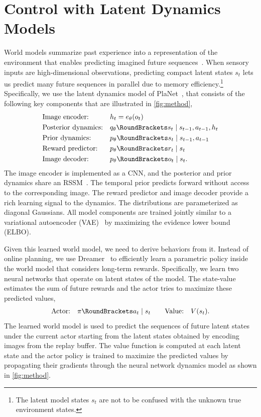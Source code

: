 \documentclass{article}
\begin{document}
\section{Control with Latent Dynamics Models}
\label{sec:background}
World models summarize past experience into a representation of the environment that enables predicting imagined future sequences~\cite{sutton1991dyna,watter2015embed,ha2018world}. When sensory inputs are high-dimensional observations, predicting compact latent states $s_t$ lets us predict many future sequences in parallel due to memory efficiency.\footnote{The latent model states $s_t$ are not to be confused with the unknown true environment states.} Specifically, we use the latent dynamics model of PlaNet~\cite{hafner2018planet}, that consists of the following key components that are illustrated in \cref{fig:method},
\begin{gather}
\begin{aligned}
&\text{Image encoder:} &&h_t=e_\theta(o_t) \\
&\text{Posterior dynamics:} &&\pr[q_\theta](s_t|s_{t-1},a_{t-1},h_t) \\
&\text{Prior dynamics:} &&\pr[p_\theta](s_t|s_{t-1},a_{t-1}) \\
&\text{Reward predictor:} &&\pr[p_\theta](r_t|s_t) \\
&\text{Image decoder:} &&\pr[p_\theta](o_t|s_t).
\label{eq:world_model}
\end{aligned}
\end{gather}%
The image encoder is implemented as a CNN, and the posterior and prior dynamics share an RSSM~\cite{hafner2018planet}. The temporal prior predicts forward without access to the corresponding image. The reward predictor and image decoder provide a rich learning signal to the dynamics. The distributions are parameterized as diagonal Gaussians. All model components are trained jointly similar to a variational autoencoder (VAE)~\cite{kingma2013vae,rezende2014vae} by maximizing the evidence lower bound (ELBO).

%
%
%
%
%
%
%

Given this learned world model, we need to derive behaviors from it. Instead of online planning, we use Dreamer~\cite{hafner2019dreamer} to efficiently learn a parametric policy inside the world model that considers long-term rewards. Specifically, we learn two neural networks that operate on latent states of the model. The state-value estimates the sum of future rewards and the actor tries to maximize these predicted values,
\begin{gather}
\begin{aligned}
\text{Actor:} \quad \pol(a_t|s_t) \qquad
\text{Value:} \quad \val(s_t).
\label{eq:actor_critic}
\end{aligned}
\end{gather}%
The learned world model is used to predict the sequences of future latent states under the current actor starting from the latent states obtained by encoding images from the replay buffer. The value function is computed at each latent state and the actor policy is trained to maximize the predicted values by propagating their gradients through the neural network dynamics model as shown in \cref{fig:method}.
\end{document}
